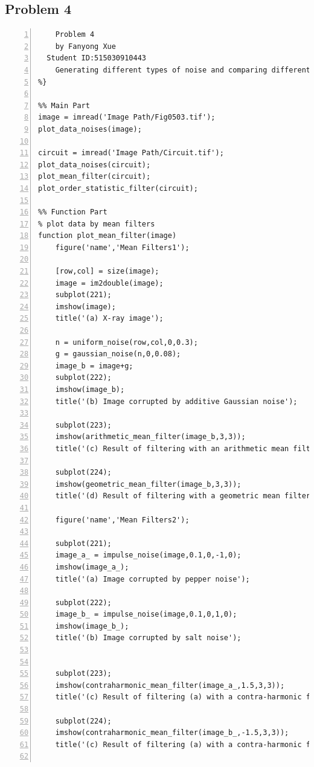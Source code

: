 \documentclass[11pt,oneside]{book}
\begin{document}
\begin{appendices}
\section{Problem 4}

\begin{lstlisting}[numbers=left, numberstyle=\tiny,keywordstyle=\color{blue!70},commentstyle=\color{red!50!green!50!blue!50},frame=shadowbox, rulesepcolor=\color{red!20!green!20!blue!20}] 
%{
    Problem 4
    by Fanyong Xue
  Student ID:515030910443
    Generating different types of noise and comparing different noise reduction methods
%}

%% Main Part
image = imread('Image Path/Fig0503.tif');
plot_data_noises(image);

circuit = imread('Image Path/Circuit.tif');
plot_data_noises(circuit);
plot_mean_filter(circuit);
plot_order_statistic_filter(circuit);

%% Function Part
% plot data by mean filters
function plot_mean_filter(image)
    figure('name','Mean Filters1');
    
    [row,col] = size(image);
    image = im2double(image);
    subplot(221);
    imshow(image);
    title('(a) X-ray image');
    
    n = uniform_noise(row,col,0,0.3);
    g = gaussian_noise(n,0,0.08);
    image_b = image+g;
    subplot(222);
    imshow(image_b);
    title('(b) Image corrupted by additive Gaussian noise');
    
    subplot(223);
    imshow(arithmetic_mean_filter(image_b,3,3));
    title('(c) Result of filtering with an arithmetic mean filter');
    
    subplot(224);
    imshow(geometric_mean_filter(image_b,3,3));
    title('(d) Result of filtering with a geometric mean filter');
    
    figure('name','Mean Filters2');
    
    subplot(221);
    image_a_ = impulse_noise(image,0.1,0,-1,0);
    imshow(image_a_);
    title('(a) Image corrupted by pepper noise');
    
    subplot(222);
    image_b_ = impulse_noise(image,0.1,0,1,0);
    imshow(image_b_);
    title('(b) Image corrupted by salt noise');
    
    
    subplot(223);
    imshow(contraharmonic_mean_filter(image_a_,1.5,3,3));
    title('(c) Result of filtering (a) with a contra-harmonic filter');
    
    subplot(224);
    imshow(contraharmonic_mean_filter(image_b_,-1.5,3,3));
    title('(c) Result of filtering (a) with a contra-harmonic filter');
    

\end{lstlisting}
\end{appendices}
\end{document}
